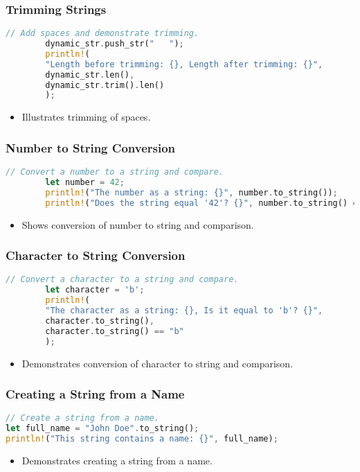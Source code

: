 \documentclass[aspectratio=169, table]{beamer}
\begin{document}
\begin{frame}[fragile]
	\frametitle{Trimming Strings}
	\begin{lstlisting}[language=Rust]
		// Add spaces and demonstrate trimming.
		dynamic_str.push_str("   ");
		println!(
		"Length before trimming: {}, Length after trimming: {}",
		dynamic_str.len(),
		dynamic_str.trim().len()
		);
	\end{lstlisting}
	\begin{itemize}
		\item Illustrates trimming of spaces.
	\end{itemize}
\end{frame}


\begin{frame}[fragile]
	\frametitle{Number to String Conversion}
	\begin{lstlisting}[language=Rust]
		// Convert a number to a string and compare.
		let number = 42;
		println!("The number as a string: {}", number.to_string());
		println!("Does the string equal '42'? {}", number.to_string() == "42");
	\end{lstlisting}
	\begin{itemize}
		\item Shows conversion of number to string and comparison.
	\end{itemize}
\end{frame}

\begin{frame}[fragile]
	\frametitle{Character to String Conversion}
	\begin{lstlisting}[language=Rust]
		// Convert a character to a string and compare.
		let character = 'b';
		println!(
		"The character as a string: {}, Is it equal to 'b'? {}",
		character.to_string(),
		character.to_string() == "b"
		);
	\end{lstlisting}
	\begin{itemize}
		\item Demonstrates conversion of character to string and comparison.
	\end{itemize}
\end{frame}


\begin{frame}[fragile]
\frametitle{Creating a String from a Name}
\begin{lstlisting}[language=Rust]
// Create a string from a name.
let full_name = "John Doe".to_string();
println!("This string contains a name: {}", full_name);
\end{lstlisting}
\begin{itemize}
\item Demonstrates creating a string from a name.
\end{itemize}
\end{frame}
\end{document}
